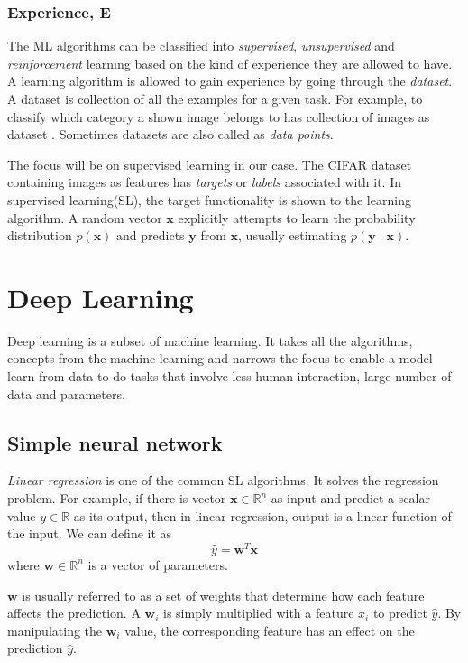 \subsubsection*{Experience, E}
The ML algorithms can be classified into \textit{supervised}, \textit{unsupervised} and
\textit{reinforcement} learning based on the kind of experience they are allowed to have.
A learning algorithm is allowed to gain experience by going through the \textit{dataset}.
A dataset is collection of all the examples for a given task. For example, to classify
which category a shown image belongs to has collection of images as dataset
\cite{cifar10}. Sometimes datasets are also called as \textit{data points}.

The focus will be on supervised learning in our case. The CIFAR
dataset \cite{cifar10} containing images as features has \textit{targets} or
\textit{labels} associated with it. In supervised learning(SL), the target functionality
is shown to the learning algorithm. A random vector $\mathbf{x}$ explicitly attempts to
learn the probability distribution $p(\mathbf{x})$ and predicts $\mathbf{y}$ from
$\mathbf{x}$, usually estimating $p(\mathbf{y}\mid\mathbf{x})$.

\section{Deep Learning}
Deep learning is a subset of machine learning. It takes all the algorithms, concepts from
the machine learning and narrows the focus to enable a model learn from data to do tasks
that involve less human interaction, large number of data and parameters.

\subsection{Simple neural network}
\textit{Linear regression} is one of the common SL algorithms. It solves the regression
problem. For example, if there is vector $\mathbf{x} \in \mathbb{R}^n$ as input and
predict a scalar value $y \in \mathbb{R}$ as its output, then in linear regression, output
is a linear function of the input. We can define it as
\begin{equation}
    \hat y = \mathbf{w}^T\mathbf{x}
    \label{eq:linear equation}
\end{equation}
where $\mathbf{w} \in \mathbb{R}^n$ is a vector of parameters.

$\mathbf{w}$ is usually referred to as a set of weights that determine how each feature
affects the prediction. A $\mathbf{w}_i$ is simply multiplied with a feature $x_i$ to
predict $\hat y$. By manipulating the $\mathbf{w}_i$ value, the corresponding feature has
an effect on the prediction  $\hat y$.

